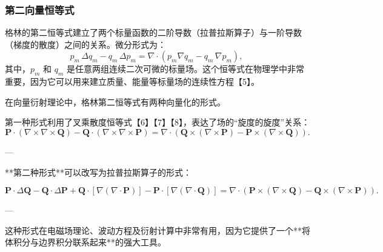 \subsubsection{第二向量恒等式}
格林的第二恒等式建立了两个标量函数的二阶导数（拉普拉斯算子）与一阶导数（梯度的散度）之间的关系。微分形式为：
$$
p_{m}\,\Delta q_{m} - q_{m}\,\Delta p_{m} = \nabla \cdot \left(p_{m}\nabla q_{m} - q_{m}\,\nabla p_{m}\right),~
$$
其中，$p_{m}$ 和 $q_{m}$ 是任意两组连续二次可微的标量场。这个恒等式在物理学中非常重要，因为它可以用来建立质量、能量等标量场的连续性方程【5】。

在向量衍射理论中，格林第二恒等式有两种向量化的形式。

第一种形式利用了叉乘散度恒等式【6】【7】【8】，表达了场的“旋度的旋度”关系：
$$
\mathbf{P} \cdot (\nabla \times \nabla \times \mathbf{Q})
- \mathbf{Q} \cdot (\nabla \times \nabla \times \mathbf{P})
= \nabla \cdot \left(\mathbf{Q} \times (\nabla \times \mathbf{P})
- \mathbf{P} \times (\nabla \times \mathbf{Q})\right).
$$

---

**第二种形式**可以改写为拉普拉斯算子的形式：

$$
\mathbf{P} \cdot \Delta \mathbf{Q} 
- \mathbf{Q} \cdot \Delta \mathbf{P} 
+ \mathbf{Q} \cdot [\nabla (\nabla \cdot \mathbf{P})]
- \mathbf{P} \cdot [\nabla (\nabla \cdot \mathbf{Q})]
= 
\nabla \cdot \left(\mathbf{P} \times (\nabla \times \mathbf{Q})
- \mathbf{Q} \times (\nabla \times \mathbf{P})\right).
$$

---

这种形式在电磁场理论、波动方程及衍射计算中非常有用，因为它提供了一个**将体积分与边界积分联系起来**的强大工具。
